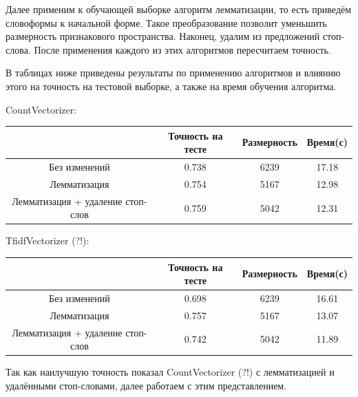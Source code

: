 \documentclass{article}
\begin{document}
                Далее применим к обучающей выборке алгоритм лемматизации, то есть приведём словоформы к начальной форме. Такое преобразование позволит уменьшить размерность признакового пространства. Наконец, удалим из предложений стоп-слова. После применения каждого из этих алгоритмов пересчитаем точность.

                В таблицах ниже приведены результаты по применению алгоритмов и влиянию этого на точность на тестовой выборке, а также на время обучения алгоритма.

                CountVectorizer:
                \begin{center}
                    \begin{tabular}{| c | c | c | c |}
                        \hline
                        & Точность на тесте & Размерность & Время(с) \\
                        \hline
                        Без изменений & 0.738 & 6239 & 17.18\\
                        \hline
                        Лемматизация & 0.754 & 5167 & 12.98 \\
                        \hline
                        Лемматизация + удаление стоп-слов & 0.759 & 5042 & 12.31 \\
                        \hline
                    \end{tabular}
                \end{center}

                TfidfVectorizer (?!):
                \begin{center}
                    \begin{tabular}{| c | c | c | c |}
                        \hline
                        & Точность на тесте & Размерность & Время(с) \\
                        \hline
                        Без изменений & 0.698 & 6239 & 16.61\\
                        \hline
                        Лемматизация & 0.757 & 5167 & 13.07 \\
                        \hline
                        Лемматизация + удаление стоп-слов & 0.742 & 5042 & 11.89 \\
                        \hline
                    \end{tabular}
                \end{center}

                Так как наилучшую точность показал CountVectorizer (?!) с лемматизацией и удалёнными стоп-словами, далее работаем с этим представлением.
\end{document}
